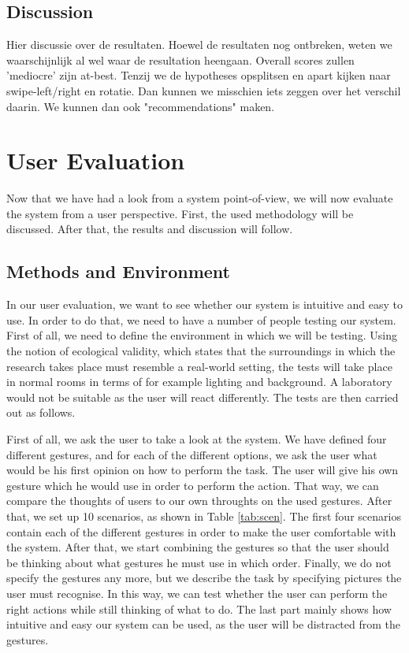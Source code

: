 \documentclass[11pt,a4paper]{article}
\begin{document}
\subsection{Discussion}
Hier discussie over de resultaten. Hoewel de resultaten nog ontbreken, weten we waarschijnlijk al wel waar de resultation heengaan. Overall scores zullen 'mediocre' zijn at-best. Tenzij we de hypotheses opsplitsen en apart kijken naar swipe-left/right en rotatie. Dan kunnen we misschien iets zeggen over het verschil daarin. We kunnen dan ook "recommendations" maken.


\section{User Evaluation}
Now that we have had a look from a system point-of-view, we will now evaluate the system from a user perspective. First, the used methodology will be discussed. After that, the results and discussion will follow.

\subsection{Methods and Environment}
\label{sub:userMeth}
In our user evaluation, we want to see whether our system is intuitive and easy to use. In order to do that, we need to have a number of people testing our system. First of all, we need to define the environment in which we will be testing. Using the notion of ecological validity, which states that the surroundings in which the research takes place must resemble a real-world setting, the tests will take place in normal rooms in terms of for example lighting and background. A laboratory would not be suitable as the user will react differently. The tests are then carried out as follows. 


First of all, we ask the user to take a look at the system. We have defined four different gestures, and for each of the different options, we ask the user what would be his first opinion on how to perform the task. The user will give his own gesture which he would use in order to perform the action. That way, we can compare the thoughts of users to our own throughts on the used gestures. After that, we set up 10 scenarios, as shown in Table \ref{tab:scen}. The first four scenarios contain each of the different gestures in order to make the user comfortable with the system. After that, we start combining the gestures so that the user should be thinking about what gestures he must use in which order. Finally, we do not specify the gestures any more, but we describe the task by specifying pictures the user must recognise. In this way, we can test whether the user can perform the right actions while still thinking of what to do. The last part mainly shows how intuitive and easy our system can be used, as the user will be distracted from the gestures. 
\end{document}
